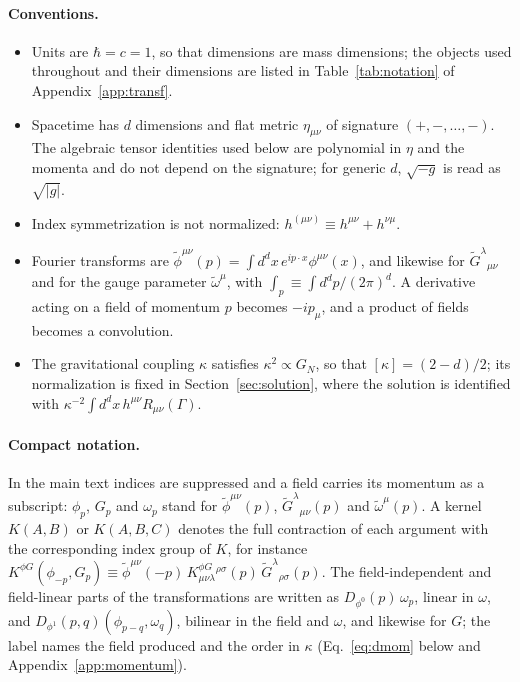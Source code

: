 \documentclass[prd,aps,preprint,nofootinbib,amsmath,amssymb,eqsecnum]{revtex4-2}
\newcommand{\tomega}{\tilde{\omega}}
\newcommand{\p}{\tilde{\phi}}
\newcommand{\G}{\tilde{G}}
\newcommand{\ip}[1]{\int_{#1}}
\begin{document}
\paragraph{Conventions.}
\begin{itemize}
\item Units are $\hbar=c=1$, so that dimensions are mass dimensions; the objects used
throughout and their dimensions are listed in Table~\ref{tab:notation} of
Appendix~\ref{app:transf}.
\item Spacetime has $d$ dimensions and flat metric $\eta_{\mu\nu}$ of signature
$(+,-,\dots,-)$. The algebraic tensor identities used below are polynomial in $\eta$ and the
momenta and do not depend on the signature; for generic $d$, $\sqrt{-g}$ is read as
$\sqrt{|g|}$.
\item Index symmetrization is not normalized: $h^{(\mu\nu)}\equiv h^{\mu\nu}+h^{\nu\mu}$.
\item Fourier transforms are $\p^{\mu\nu}(p)=\int d^dx\,e^{ip\cdot x}\phi^{\mu\nu}(x)$, and
likewise for $\G^{\lambda}{}_{\mu\nu}$ and for the gauge parameter $\tomega^\mu$, with
$\ip{p}\equiv\int d^dp/(2\pi)^d$. A derivative acting on a field of momentum $p$ becomes
$-ip_\mu$, and a product of fields becomes a convolution.
\item The gravitational coupling $\kappa$ satisfies $\kappa^2\propto G_N$, so that
$[\kappa]=(2-d)/2$; its normalization is fixed in Section~\ref{sec:solution}, where the
solution is identified with $\kappa^{-2}\int d^dx\,h^{\mu\nu}R_{\mu\nu}(\Gamma)$.
\end{itemize}

\paragraph{Compact notation.} In the main text indices are suppressed and a field carries
its momentum as a subscript: $\phi_p$, $G_p$ and $\omega_p$ stand for $\p^{\mu\nu}(p)$,
$\G^{\lambda}{}_{\mu\nu}(p)$ and $\tomega^\mu(p)$. A kernel $K(A,B)$ or $K(A,B,C)$ denotes the
full contraction of each argument with the corresponding index group of $K$, for instance
$K^{\phi G}(\phi_{-p},G_p)\equiv\p^{\mu\nu}(-p)\,K^{\phi G}_{\mu\nu\lambda}{}^{\rho\sigma}(p)\,\G^{\lambda}{}_{\rho\sigma}(p)$.
The field-independent and field-linear parts of the transformations are written as
$D_{\phi^0}(p)\,\omega_p$, linear in $\omega$, and $D_{\phi^1}(p,q)(\phi_{p-q},\omega_q)$, bilinear in the field and $\omega$, and
likewise for $G$; the label names the field produced and the order in $\kappa$
(Eq.~\eqref{eq:dmom} below and Appendix~\ref{app:momentum}).
\end{document}
